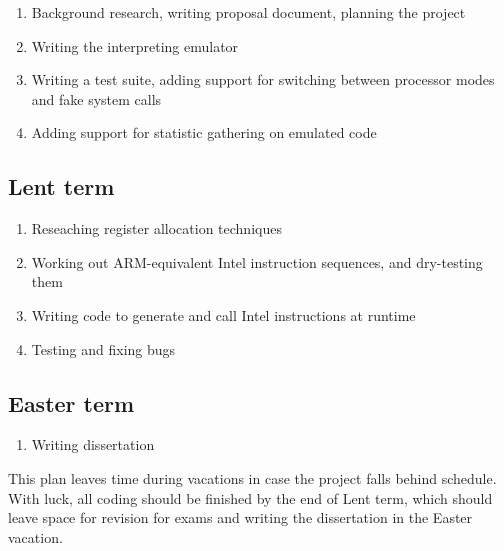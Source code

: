 \begin{enumerate}

\item Background research, writing proposal document,
planning the project

\item Writing the interpreting emulator

\item Writing a test suite, adding support for switching between processor
modes and fake system calls

\item Adding support for statistic gathering on emulated code

\end{enumerate}

\subsection*{Lent term}

\begin{enumerate}

\item Reseaching register allocation techniques

\item Working out ARM-equivalent Intel instruction sequences, and
dry-testing them

\item Writing code to generate and call Intel instructions at runtime

\item Testing and fixing bugs

\end{enumerate}

\subsection*{Easter term}

\begin{enumerate}

\item Writing dissertation

\end{enumerate}

This plan leaves time during vacations in case the project falls
behind schedule. With luck, all coding should be finished by the end
of Lent term, which should leave space for revision for exams and writing the
dissertation in the Easter vacation.
